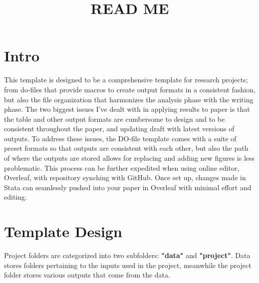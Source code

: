 \documentclass[12pt]{article}
\title{READ ME}
\begin{document}
\maketitle

\section{Intro}
This template is designed to be a comprehensive template for research projects; from do-files that provide macros to create output formats in a consistent fashion, but also the file organization that harmonizes the analysis phase with the writing phase. The two biggest issues I've dealt with in applying results to paper is that the table and other output formats are cumbersome to design and to be consistent throughout the paper, and updating draft with latest versions of outputs. To address these issues, the DO-file template comes with a suite of preset formats so that outputs are consistent with each other, but also the path of where the outputs are stored allows for replacing and adding new figures is less problematic. This process can be further expedited when using online editor, Overleaf, with repository synching with GitHub. Once set up, changes made in Stata can seamlessly pushed into your paper in Overleaf with minimal effort and editing.

\section{Template Design}
Project folders are categorized into two subfolders: \textbf{"data"} and \textbf{"project"}. Data stores folders pertaining to the inputs used in the project, meanwhile the project folder stores various outputs that come from the data.
\end{document}
